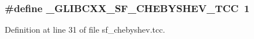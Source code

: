 \subsubsection[{\+\_\+\+G\+L\+I\+B\+C\+X\+X\+\_\+\+S\+F\+\_\+\+C\+H\+E\+B\+Y\+S\+H\+E\+V\+\_\+\+T\+C\+C}]{\setlength{\rightskip}{0pt plus 5cm}\#define \+\_\+\+G\+L\+I\+B\+C\+X\+X\+\_\+\+S\+F\+\_\+\+C\+H\+E\+B\+Y\+S\+H\+E\+V\+\_\+\+T\+C\+C~1}\label{sf__chebyshev_8tcc_a4a6b0a9b7599b04e1e7316ab679fa7f5}


Definition at line 31 of file sf\+\_\+chebyshev.\+tcc.


